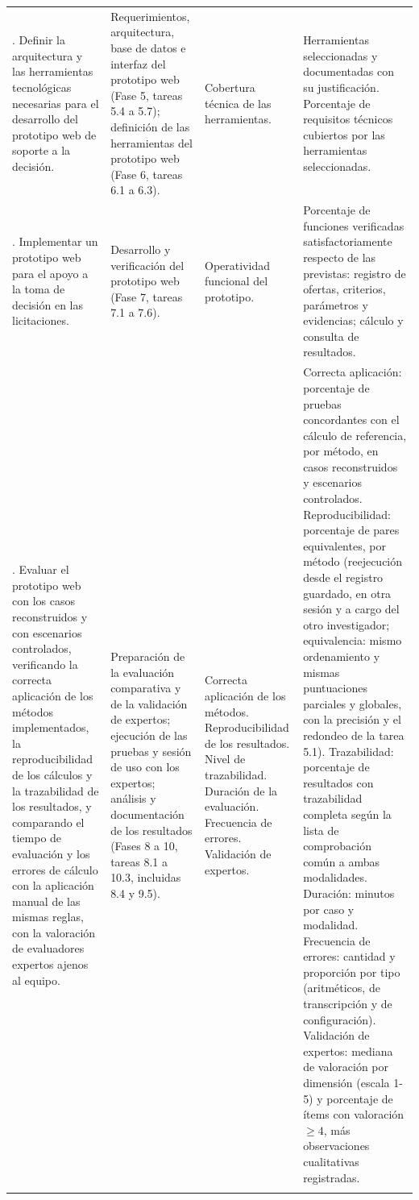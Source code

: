 \documentclass[12pt,a4paper]{article}
\begin{document}
\begin{center}
\begin{longtable}{>{\raggedright\arraybackslash}p{2.1cm} >{\raggedright\arraybackslash}p{2.7cm} >{\raggedright\arraybackslash}p{2.1cm} >{\raggedright\arraybackslash}p{4.3cm}}
\addlinespace
4. Definir la arquitectura y las herramientas tecnológicas necesarias para el desarrollo del prototipo web de soporte a la decisión. & Requerimientos, arquitectura, base de datos e interfaz del prototipo web (Fase 5, tareas 5.4 a 5.7); definición de las herramientas del prototipo web (Fase 6, tareas 6.1 a 6.3). & Cobertura técnica de las herramientas. & Herramientas seleccionadas y documentadas con su justificación. Porcentaje de requisitos técnicos cubiertos por las herramientas seleccionadas. \\
\addlinespace
5. Implementar un prototipo web para el apoyo a la toma de decisión en las licitaciones. & Desarrollo y verificación del prototipo web (Fase 7, tareas 7.1 a 7.6). & Operatividad funcional del prototipo. & Porcentaje de funciones verificadas satisfactoriamente respecto de las previstas: registro de ofertas, criterios, parámetros y evidencias; cálculo y consulta de resultados. \\
\addlinespace
6. Evaluar el prototipo web con los casos reconstruidos y con escenarios controlados, verificando la correcta aplicación de los métodos implementados, la reproducibilidad de los cálculos y la trazabilidad de los resultados, y comparando el tiempo de evaluación y los errores de cálculo con la aplicación manual de las mismas reglas, con la valoración de evaluadores expertos ajenos al equipo. & Preparación de la evaluación comparativa y de la validación de expertos; ejecución de las pruebas y sesión de uso con los expertos; análisis y documentación de los resultados (Fases 8 a 10, tareas 8.1 a 10.3, incluidas 8.4 y 9.5). & Correcta aplicación de los métodos. Reproducibilidad de los resultados. Nivel de trazabilidad. Duración de la evaluación. Frecuencia de errores. Validación de expertos. & Correcta aplicación: porcentaje de pruebas concordantes con el cálculo de referencia, por método, en casos reconstruidos y escenarios controlados. Reproducibilidad: porcentaje de pares equivalentes, por método (reejecución desde el registro guardado, en otra sesión y a cargo del otro investigador; equivalencia: mismo ordenamiento y mismas puntuaciones parciales y globales, con la precisión y el redondeo de la tarea 5.1). Trazabilidad: porcentaje de resultados con trazabilidad completa según la lista de comprobación común a ambas modalidades. Duración: minutos por caso y modalidad. Frecuencia de errores: cantidad y proporción por tipo (aritméticos, de transcripción y de configuración). Validación de expertos: mediana de valoración por dimensión (escala 1-5) y porcentaje de ítems con valoración $\geq 4$, más observaciones cualitativas registradas. \\
\addlinespace
\end{longtable}
\end{center}
\clearpage
\end{document}
